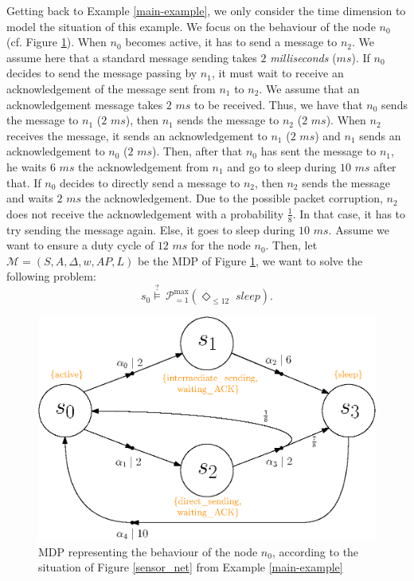 \begin{example} \label{spg-example}
Getting back to Example \ref{main-example}, we only consider the time dimension to model the situation of this example.
We focus on the behaviour of the node $n_0$  (cf. Figure \ref{sensor_net_mdp}).
When $n_0$ becomes active, it has to send a message to $n_2$. We assume here that a standard message sending takes $2$ \textit{milliseconds} ($ms$). If $n_0$ decides to send the message passing by $n_1$, it must wait to receive an acknowledgement of the message sent from $n_1$ to $n_2$. We assume that an acknowledgement message takes $2$ $ms$ to be received.
Thus, we have that $n_0$ sends the message to $n_1$ ($2$ $ms$), then $n_1$ sends the message to $n_2$ ($2$ $ms$). When $n_2$ receives the message, it sends an acknowledgement to $n_1$ ($2$ $ms$) and $n_1$ sends an acknowledgement to $n_0$ ($2$ $ms$).
Then, after that $n_0$ has sent the message to $n_1$, he waits $6$ $ms$ the acknowledgement from $n_1$ and go to sleep during $10$ $ms$ after that. If $n_0$ decides to directly send a message to $n_2$, then $n_2$ sends the message and waits $2$ $ms$ the acknowledgement.
Due to the possible packet corruption, $n_2$ does not receive the acknowledgement with a probability $\frac{1}{8}$. In that case, it has to try sending the message again.
Else, it goes to sleep during $10$ $ms$.
Assume we want to ensure a duty cycle of $12$ $ms$ for the node $n_0$. Then, let $\mathcal{M}=(S, A, \Delta, w, AP, L)$ be the MDP of Figure \ref{sensor_net_mdp}, we want to solve the following \SPG{} problem:
\[
  s_0 \overset{?}{\models} \, \mathcal{P}^{\max}_{=1}(\Diamond_{\leq 12} \; \textit{sleep}).
\]
\begin{figure}[h]
  \centering
  \includegraphics[width=0.55\linewidth]{resources/example3.eps}
  \captionsetup{justification=centering}
  \caption{MDP representing the behaviour of the node $n_0$, according to the situation of Figure \ref{sensor_net} from Example \ref{main-example}}\label{sensor_net_mdp}
\end{figure}

\end{example}
